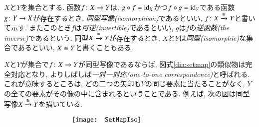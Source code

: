 \begin{definition}\label{def:iso in set}


$X$と$Y$を集合とする. 函数$f\colon X\rightarrow Y$は, $g\circ f=\textrm{id}_X$かつ$f\circ g=\textrm{id}_Y$である函数$g\colon Y\rightarrow X$が存在するとき, \emph{同型写像(isomorphism)}であるといい, $f\colon X\xrightarrow{\cong}Y$と書いて示す. またこのとき$f$は\emph{可逆(invertible)}であるといい, $g$は$f$の\emph{逆函数(the inverse)}であるという. 同型$X\xrightarrow{\cong} Y$が存在するとき, $X$と$Y$は\emph{同型(isomorphic)}な集合であるといい, $X\cong Y$と書くこともある. 

\end{definition}

\begin{example}


$X$と$Y$が集合で$f\colon X\rightarrow Y$が同型写像であるならば, 図式\ref{dia:setmap}の類似物は完全対応となり, よりしばしば\emph{一対一対応(one-to-one correspondence)}と呼ばれる. これが意味するところは, どの二つの矢印も$Y$の同じ要素に当たることがなく, $Y$の全ての要素がその像の中に含まれるということである. 例えば, 次の図は同型写像$X\xrightarrow{\cong}Y$を描いている.

\begin{align}\label{dia:setmapiso}
\parbox{2.3in}{\texttt{[image: SetMapIso]}}
\end{align}

\end{example}

